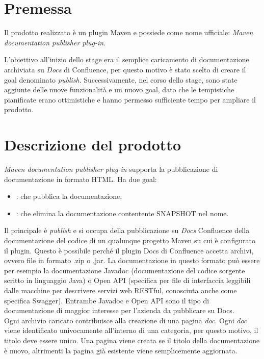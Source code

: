 \section{Premessa}
Il prodotto realizzato è un plugin Maven e possiede come nome ufficiale: \emph{Maven documentation publisher plug-in}.

L'obiettivo all'inizio dello stage era il semplice caricamento di documentazione archiviata su \emph{Docs} di Confluence, per questo motivo è stato scelto di creare il goal denominato \emph{publish}.
Successivamente, nel corso dello stage, sono state aggiunte delle nuove funzionalità e un nuovo goal, dato che le tempistiche pianificate erano ottimistiche e hanno permesso sufficiente tempo per ampliare il prodotto.


\section{Descrizione del prodotto}

\emph{Maven documentation publisher plug-in} supporta la pubblicazione di documentazione in formato HTML. Ha due goal:
\begin{itemize}
	\item {}: che pubblica la documentazione;
	\item {}: che elimina la documentazione contentente SNAPSHOT nel nome.
\end{itemize}
Il principale è \emph{publish} e si occupa della pubblicazione su  \emph{Docs} Confluence della documentazione del codice di un qualunque progetto Maven su cui è configurato il plugin.
Questo è possibile perché il plugin Docs di Confluence accetta archivi, ovvero file in formato .zip o .jar.
La documentazione in questo formato può essere per esempio la documentazione Javadoc (documentazione del codice sorgente scritto in linguaggio Java) o Open API (specifica per file di interfaccia leggibili dalle macchine per descrivere servizi web RESTful, conosciuta anche come specifica Swagger).
Entrambe Javadoc e Open API sono il tipo di documentazione di maggior interesse per l'azienda da pubblicare su Docs. \\
Ogni archivio caricato contribuisce alla creazione di una pagina \emph{doc}.
Ogni \emph{doc} viene identificato univocamente all'interno di una categoria, per questo motivo, il titolo deve essere unico.
Una pagina viene creata se il titolo della documentazione è nuovo, altrimenti la pagina già esistente viene semplicemente aggiornata. \\ 
 
